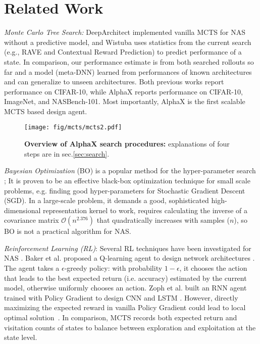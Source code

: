 \documentclass[10pt,twocolumn,letterpaper]{article}
\begin{document}
\section{Related Work}


\textit{Monte Carlo Tree Search:} DeepArchitect\cite{negrinho2017deeparchitect} implemented vanilla MCTS for NAS without a predictive model, and Wistuba \cite{wistuba2017finding} uses statistics from the current search (e.g., RAVE and Contextual Reward Prediction) to predict performance of a state. In comparison, our performance estimate is from both searched rollouts so far and a model (meta-DNN) learned from performances of known architectures and can generalize to unseen architectures. Both previous works report performance on CIFAR-10, while AlphaX reports performance on CIFAR-10, ImageNet, and NASBench-101. Most importantly, AlphaX is the first scalable MCTS based design agent.


\begin{figure}
\vspace{-0.2in}
\centering 
\texttt{[image: fig/mcts/mcts2.pdf]}
\caption{\textbf{Overview of AlphaX search procedures:} explanations of four steps are in sec.\ref{sec:search}.}
\label{fig:mcts-procedures}
\end{figure}

\textit{Bayesian Optimization} (BO) is a popular method for the hyper-parameter search \cite{hutter2011sequential,snoek2012practical,thornton2013auto,kandasamy2015high}; It is proven to be an effective black-box optimization technique for small scale problems, e.g. finding good hyper-parameters for Stochastic Gradient Descent (SGD). In a large-scale problem, it demands a good, sophisticated high-dimensional representation kernel to work, requires calculating the inverse of a covariance matrix $\mathcal{O}(n^{2.376})$ that quadratically increases with samples ($n$), so BO is not a practical algorithm for NAS.





\textit{Reinforcement Learning (RL)}: Several RL techniques have been investigated for NAS \cite{Baker2016,Zoph2016}.
Baker et al. proposed a Q-learning agent to design network architectures \cite{Baker2016}. The agent takes a $\epsilon$-greedy policy: with probability $1-\epsilon$, it chooses the action that leads to the best expected return (i.e. accuracy) estimated by the current model, otherwise uniformly chooses an action. Zoph et al. built an RNN agent trained with Policy Gradient to design CNN and LSTM \cite{Zoph2016}. However, directly maximizing the expected reward in vanilla Policy Gradient could lead to local optimal solution~\cite{nachum2016improving}. In comparison, MCTS records both expected return and visitation counts of states to balance between exploration and exploitation at the state level.
\end{document}
